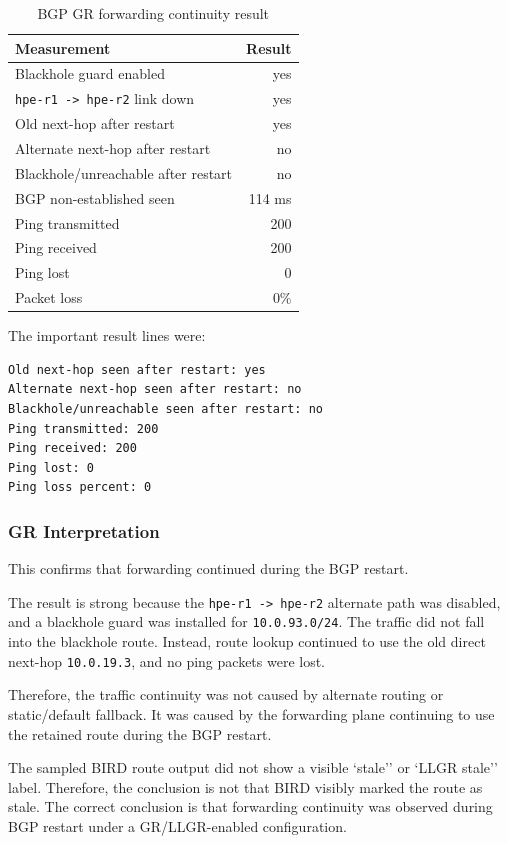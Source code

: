 \begin{table}[h]
\centering
\begin{tabular}{|l|r|}
\hline
\textbf{Measurement} & \textbf{Result} \\
\hline
Blackhole guard enabled & yes \\
\hline
\texttt{hpe-r1 -> hpe-r2} link down & yes \\
\hline
Old next-hop after restart & yes \\
\hline
Alternate next-hop after restart & no \\
\hline
Blackhole/unreachable after restart & no \\
\hline
BGP non-established seen & 114 ms \\
\hline
Ping transmitted & 200 \\
\hline
Ping received & 200 \\
\hline
Ping lost & 0 \\
\hline
Packet loss & 0\% \\
\hline
\end{tabular}
\caption{BGP GR forwarding continuity result}
\end{table}

The important result lines were:

\begin{verbatim}
Old next-hop seen after restart: yes
Alternate next-hop seen after restart: no
Blackhole/unreachable seen after restart: no
Ping transmitted: 200
Ping received: 200
Ping lost: 0
Ping loss percent: 0
\end{verbatim}

\subsubsection{GR Interpretation}

This confirms that forwarding continued during the BGP restart.

The result is strong because the \texttt{hpe-r1 -> hpe-r2} alternate path was disabled, and a blackhole guard was installed for \texttt{10.0.93.0/24}. The traffic did not fall into the blackhole route. Instead, route lookup continued to use the old direct next-hop \texttt{10.0.19.3}, and no ping packets were lost.

Therefore, the traffic continuity was not caused by alternate routing or static/default fallback. It was caused by the forwarding plane continuing to use the retained route during the BGP restart.

The sampled BIRD route output did not show a visible `stale'' or `LLGR stale'' label. Therefore, the conclusion is not that BIRD visibly marked the route as stale. The correct conclusion is that forwarding continuity was observed during BGP restart under a GR/LLGR-enabled configuration.

